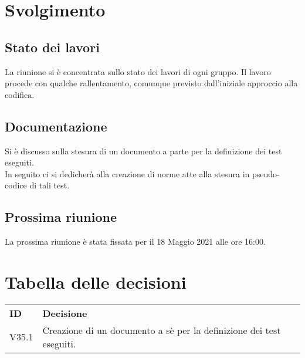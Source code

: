 \documentclass[]{article}
\begin{document}
	\newpage

	\section{Svolgimento}
		\subsection{Stato dei lavori}
		La riunione si è concentrata sullo stato dei lavori di ogni gruppo. Il lavoro procede con qualche rallentamento, comunque previsto dall'iniziale approccio alla codifica.
		
		\subsection{Documentazione}
		Si è discusso sulla stesura di un documento a parte per la definizione dei test eseguiti. \\
		In seguito ci si dedicherà alla creazione di norme atte alla stesura in pseudo-codice di tali test.

		\subsection{Prossima riunione}
		La prossima riunione è stata fissata per il 18 Maggio 2021 alle ore 16:00.




	\section{Tabella delle decisioni}

	\begin{table} [h!]
		\begin{center}
			\begin{tabular} { m{2cm} m{14cm} }
				\rowcolor{lightgray}
				\textbf{ID} & \textbf{Decisione}\\
				V35.1 & Creazione di un documento a sè per la definizione dei test eseguiti.
				
			\end{tabular}
		\end{center}
	\end{table}
\end{document}
